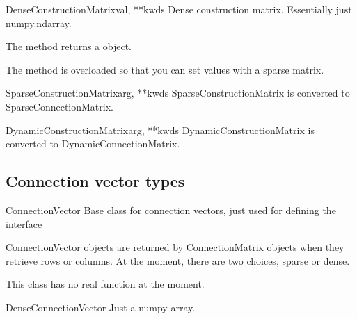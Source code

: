 \documentclass[letterpaper,10pt,english]{manual}
\begin{document}
\hypertarget{brian.DenseConstructionMatrix}{}\begin{classdesc}{DenseConstructionMatrix}{val, **kwds}
Dense construction matrix. Essentially just numpy.ndarray.

The  method returns a \hyperlink{brian.DenseConnectionMatrix}{}
object.

The  method is overloaded so that you can set values with
a sparse matrix.
\end{classdesc}

\hypertarget{brian.SparseConstructionMatrix}{}\begin{classdesc}{SparseConstructionMatrix}{arg, **kwds}
SparseConstructionMatrix is converted to SparseConnectionMatrix.
\end{classdesc}

\hypertarget{brian.DynamicConstructionMatrix}{}\begin{classdesc}{DynamicConstructionMatrix}{arg, **kwds}
DynamicConstructionMatrix is converted to DynamicConnectionMatrix.
\end{classdesc}


\subsection{Connection vector types}

\hypertarget{brian.ConnectionVector}{}\begin{classdesc}{ConnectionVector}{}
Base class for connection vectors, just used for defining the interface

ConnectionVector objects are returned by ConnectionMatrix objects when
they retrieve rows or columns. At the moment, there are two choices,
sparse or dense.

This class has no real function at the moment.
\end{classdesc}

\hypertarget{brian.DenseConnectionVector}{}\begin{classdesc}{DenseConnectionVector}{}
Just a numpy array.
\end{classdesc}
\end{document}

